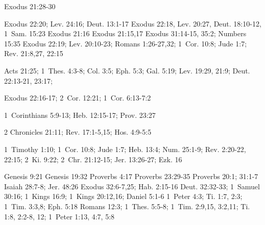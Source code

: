 {\begin{multicols*}{3}
{ 
    Exodus 21:28-30
    
    Exodus 22:20;
    Lev. 24:16;
    Deut. 13:1-17
    Exodus 22:18, Lev. 20:27, Deut. 18:10-12, 1~Sam. 15:23
    Exodus 21:16
    Exodus 21:15,17
    Exodus 31:14-15, 35:2;
    Numbers 15:35
    Exodus 22:19;
    Lev. 20:10-23;
    Romans 1:26-27,32; 
    1~Cor. 10:8;
    Jude 1:7;
    Rev. 21:8,27, 22:15

{}
    Acts 21:25;
    1~Thes. 4:3-8;
    Col. 3:5;
    Eph. 5:3;
    Gal. 5:19;
    Lev. 19:29, 21:9;
    Deut. 22:13-21, 23:17;
    
 Exodus 22:16-17;
    2~Cor. 12:21;
    1~Cor. 6:13-7:2
   
    1~Corinthians 5:9-13;
    Heb. 12:15-17;
    Prov. 23:27
    
    2 Chronicles 21:11;
    Rev. 17:1-5,15;
    Hos. 4:9-5:5
    
    1~Timothy 1:10;
    1~Cor. 10:8;
    Jude 1:7;
    Heb. 13:4;
    Num. 25:1-9;
    Rev. 2:20-22, 22:15;
    2~Ki. 9:22;
    2~Chr. 21:12-15;
    Jer. 13:26-27;
    Ezk. 16
    
 Genesis 9:21
 Genesis 19:32
 Proverbs 4:17
 Proverbs 23:29-35
 Proverbs 20:1; 31:1-7
 Isaiah 28:7-8; Jer. 48:26
 Exodus 32:6-7,25; Hab. 2:15-16
 Deut. 32:32-33; 1~Samuel 30:16; 1~Kings 16:9; 1~Kings 20:12,16; Daniel 5:1-6
 1~Peter 4:3; Ti. 1:7, 2:3; 1~Tim. 3:3,8; Eph. 5:18
 Romans 12:3; 1~Thes. 5:5-8; 1~Tim. 2:9,15, 3:2,11; Ti. 1:8, 2:2-8, 12; 1~Peter 1:13, 4:7, 5:8



}\end{multicols*}
\setlength{\parindent}{1em}
}


